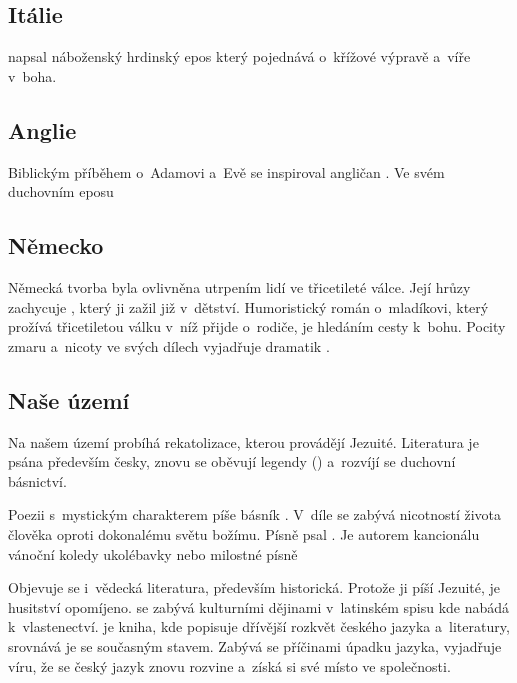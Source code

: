 \subsection*{Itálie}
 napsal náboženský hrdinský epos  který pojednává
o~křížové výpravě a~víře v~boha.

\subsection*{Anglie}
Biblickým příběhem o~Adamovi a~Evě se inspiroval angličan . Ve svém duchovním eposu

\subsection*{Německo}
Německá tvorba byla ovlivněna utrpením lidí ve třicetileté válce. Její hrůzy zachycuje 
, který ji zažil již v~dětství.
Humoristický román  o~mladíkovi, který prožívá třicetiletou 
válku v~níž přijde o~rodiče, je hledáním cesty k~bohu.
Pocity zmaru a~nicoty ve svých dílech vyjadřuje dramatik .

\subsection*{Naše území}
Na našem území probíhá rekatolizace, kterou provádějí Jezuité. Literatura je psána především česky, 
znovu se oběvují legendy () a~rozvíjí se duchovní básnictví.

Poezii s~mystickým charakterem píše básník . V~díle  se zabývá
nicotností života člověka oproti dokonalému světu božímu.
Písně psal . Je autorem kancionálu 
vánoční koledy  ukolébavky  nebo milostné písně

Objevuje se i~vědecká literatura, především historická. Protože ji píší Jezuité, je husitství opomíjeno.
 se zabývá kulturními dějinami v~latinském spisu  kde nabádá
k~vlastenectví.  je kniha,
kde popisuje dřívější rozkvět českého jazyka a~literatury, srovnává je se současným stavem. Zabývá se příčinami
úpadku jazyka, vyjadřuje víru, že se český jazyk znovu rozvine a~získá si své místo ve společnosti.
